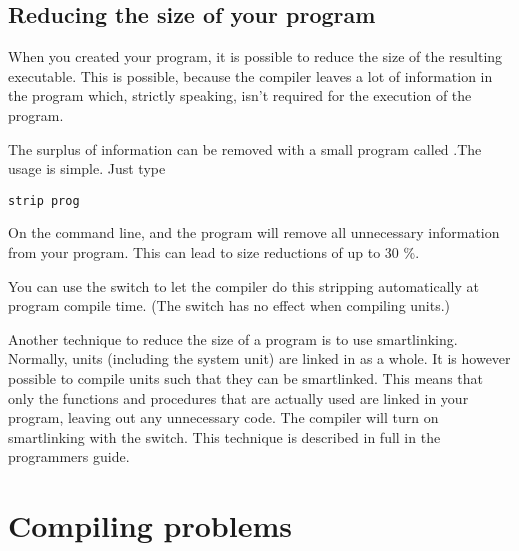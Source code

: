 \section{Reducing the size of your program}

When you created your program, it is possible to reduce the size of the
resulting executable. This is possible, because the compiler leaves a 
lot of information in the program which, strictly speaking, isn't required 
for the execution of the program. 

The surplus of information can be removed with a small program
called .The usage is simple. Just type
\begin{verbatim}
strip prog
\end{verbatim}
On the command line, and the  program will remove all unnecessary
information from your program. This can lead to size reductions of up to
30 \%.

You can use the  switch to let the compiler do this stripping
automatically at program compile time. (The switch has no effect when
compiling units.)

Another technique to reduce the size of a program is to use smartlinking.
Normally, units (including the system unit) are linked in as a whole.
It is however possible to compile units such that they can be smartlinked.
This means that only the functions and procedures that are actually used
are linked in your program, leaving out any unnecessary code. The compiler 
will turn on smartlinking with the  switch. This technique is 
described in full in the programmers guide. 

\chapter{Compiling problems}

